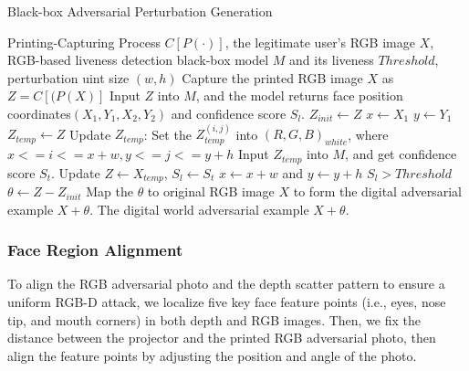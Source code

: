 \begin{algorithm}[t]
	\renewcommand{\algorithmicrequire}{\textbf{Input:}}
	\renewcommand{\algorithmicensure}{\textbf{Output:}}
	\caption{Black-box Adversarial Perturbation Generation}
	\label{alg}
	\begin{algorithmic}[1]
		\REQUIRE Printing-Capturing Process $C[P(\cdot)]$, the legitimate user's RGB image $X$, RGB-based liveness detection black-box model $M$ and its liveness  $Threshold$, perturbation uint size $(w, h)$
		\STATE Capture the printed RGB image $X$ as $Z = C[(P(X)]$
		\STATE Input $Z$ into $M$, and the model returns  face position coordinates$(X_1,Y_1,X_2,Y_2)$ and confidence score $S_l$. 
		\STATE $Z_{init} \leftarrow Z$
		\STATE $x \leftarrow X_1$
		\STATE $y \leftarrow Y_1$
		\REPEAT
		\STATE $Z_{temp} \leftarrow Z$
		\STATE Update $Z_{temp}$: Set the $Z_{temp}^{(i,j)}$ into $(R,G,B)_{white}$, where $x<=i<=x+w,y<=j<=y+h$
		\STATE Input $Z_{temp}$ into $M$, and get confidence score $S_t$. 
		\STATE Update $Z \leftarrow X_{temp}$, $S_l \leftarrow S_t$
		\ENDIF
		\STATE $x \leftarrow x+w$ and  $y \leftarrow y+h$
		\UNTIL $S_l>Threshold$
		\STATE $\theta \leftarrow Z-Z_{init}$
		\STATE Map the $\theta$ to original RGB image $X$ to form the digital adversarial example $X + \theta$.
		\ENSURE The digital world adversarial example $X + \theta$.
	\end{algorithmic}
\end{algorithm}
\vspace{-0.1in}  

\subsubsection{Face Region Alignment}
To align the RGB adversarial photo and the depth scatter pattern to ensure a uniform RGB-D attack, we localize five key face feature points (i.e., eyes, nose tip, and mouth corners) in both depth and RGB images. Then, we fix the distance between the projector and the printed RGB adversarial photo, then align the feature points by adjusting the position and angle of the photo.



